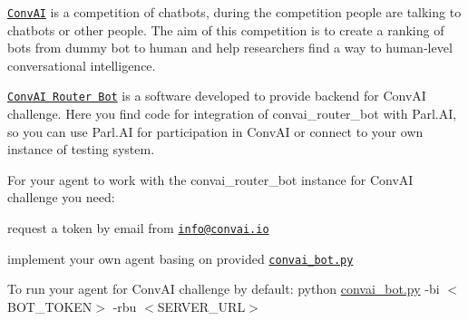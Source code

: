 \href{http://convai.io}{\tt Conv\+AI} is a competition of chatbots, during the competition people are talking to chatbots or other people. The aim of this competition is to create a ranking of bots from dummy bot to human and help researchers find a way to human-\/level conversational intelligence.

\href{https://github.com/deepmipt/convai_router_bot}{\tt Conv\+AI Router Bot} is a software developed to provide backend for Conv\+AI challenge. Here you find code for integration of {\ttfamily convai\+\_\+router\+\_\+bot} with Parl.\+AI, so you can use Parl.\+AI for participation in Conv\+AI or connect to your own instance of testing system.

For your agent to work with the {\ttfamily convai\+\_\+router\+\_\+bot} instance for Conv\+AI challenge you need\+:


\begin{DoxyItemize}
\item request a token by email from \href{info@convai.io}{\tt info@convai.\+io}
\item implement your own agent basing on provided \href{./convai_bot.py}{\tt {\ttfamily convai\+\_\+bot.\+py}}
\end{DoxyItemize}

To run your agent for Conv\+AI challenge by default\+: {\ttfamily python \hyperlink{convai__bot_8py}{convai\+\_\+bot.\+py} -\/bi $<$B\+O\+T\+\_\+\+T\+O\+K\+EN$>$ -\/rbu $<$S\+E\+R\+V\+E\+R\+\_\+\+U\+RL$>$} 